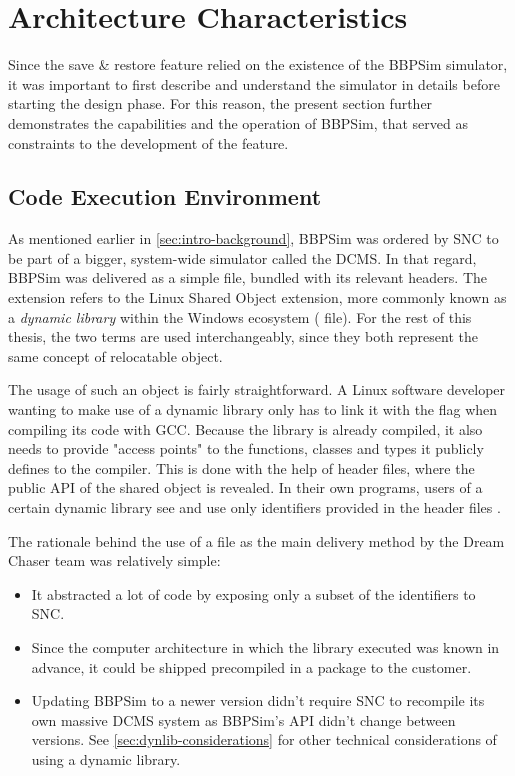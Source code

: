 {\section{Architecture Characteristics}\label{sec:bbpsim-charact}
Since the save \& restore feature relied on the existence of the \gls{BBPSim} simulator, it was important to first describe and understand the simulator in details before starting the design phase. For this reason, the present section further demonstrates the capabilities and the operation of \gls{BBPSim}, that served as constraints to the development of the feature.

\subsection*{Code Execution Environment}
As mentioned earlier in \autoref{sec:intro-background}, \gls{BBPSim} was ordered by \gls{SNC} to be part of a bigger, system-wide simulator called the \gls{DCMS}. In that regard, \gls{BBPSim} was delivered as a simple  file, bundled with its relevant headers. The  extension refers to the Linux Shared Object extension, more commonly known as a \textit{dynamic library} within the Windows ecosystem ( file). For the rest of this thesis, the two terms are used interchangeably, since they both represent the same concept of relocatable object.

The usage of such an object is fairly straightforward. A Linux software developer wanting to make use of a dynamic library only has to link it with the  flag when compiling its code with GCC. Because the library is already compiled, it also needs to provide "access points" to the functions, classes and types it publicly defines to the compiler. This is done with the help of header files, where the public API of the shared object is revealed. In their own programs, users of a certain dynamic library see and use only identifiers provided in the header files .

The rationale behind the use of a  file as the main delivery method by the Dream Chaser team was relatively simple:
\begin{itemize}
	\item It abstracted a lot of code by exposing only a subset of the identifiers to \gls{SNC}.
	\item Since the computer architecture in which the library executed was known in advance, it could be shipped precompiled in a package to the customer.
	\item Updating \gls{BBPSim} to a newer version didn't require \gls{SNC} to recompile its own massive \gls{DCMS} system as \gls{BBPSim}'s API didn't change between versions. See \autoref{sec:dynlib-considerations} for other  technical considerations of using a dynamic library.
\end{itemize}

}

